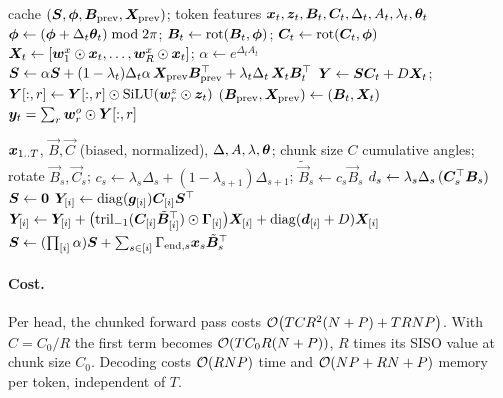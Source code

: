 \begin{algorithm}[t]
\caption{Mamba-3: one decoding step of one head (MIMO rank $R$; SISO is $R=1$).}
\label{alg:c07-m3-decode}
\begin{algorithmic}[1]
\Require cache $(\bm{S}, \bm{\phi}, \bm{B}_{\mathrm{prev}}, \bm{X}_{\mathrm{prev}})$; token features $\bm{x}_t, \bm{z}_t, \bm{B}_t, \bm{C}_t, \Delta_t, A_t, \lambda_t, \bm{\theta}_t$
\State $\bm{\phi} \gets (\bm{\phi} + \Delta_t\bm{\theta}_t) \bmod 2\pi$; \quad $\bm{B}_t \gets \operatorname{rot}(\bm{B}_t,\bm{\phi})$; \quad $\bm{C}_t \gets \operatorname{rot}(\bm{C}_t,\bm{\phi})$
\State $\bm{X}_t \gets [\bm{w}^x_1\odot\bm{x}_t,\dots,\bm{w}^x_R\odot\bm{x}_t]$; \quad $\alpha \gets e^{\Delta_tA_t}$
\State $\bm{S} \gets \alpha\bm{S} + (1-\lambda_t)\Delta_t\alpha\,\bm{X}_{\mathrm{prev}}\bm{B}_{\mathrm{prev}}^{\top} + \lambda_t\Delta_t\,\bm{X}_t\bm{B}_t^{\top}$ 
\State $\bm{Y} \gets \bm{S}\bm{C}_t + D\bm{X}_t$; \quad $\bm{Y}[:,r] \gets \bm{Y}[:,r]\odot\operatorname{SiLU}(\bm{w}^z_r\odot\bm{z}_t)$
\State $(\bm{B}_{\mathrm{prev}}, \bm{X}_{\mathrm{prev}}) \gets (\bm{B}_t, \bm{X}_t)$
\State \Return $\bm{y}_t = \sum_r \bm{w}^o_r\odot\bm{Y}[:,r]$
\end{algorithmic}
\end{algorithm}

\begin{algorithm}[t]
\caption{Mamba-3 SISO: chunked prefill of one head (structure of the Triton kernel).}
\label{alg:c07-m3-chunk}
\begin{algorithmic}[1]
\Require $\bm{x}_{1..T}$, $\vec B, \vec C$ (biased, normalized), $\Delta, A, \lambda, \bm{\theta}$; chunk size $C$
  \State cumulative angles; rotate $\vec B_s,\vec C_s$; $c_s \gets \lambda_s\Delta_s + (1-\lambda_{s+1})\Delta_{s+1}$; $\tilde{\vec B}_s \gets c_s\vec B_s$
  \State $d_s \gets \lambda_s\Delta_s\,(\bm{C}_s^{\top}\bm{B}_s)$ 
\EndFor
\State $\bm{S} \gets \bm0$
  \State $\bm{Y}_{[i]} \gets \operatorname{diag}(\bm{g}_{[i]})\bm{C}_{[i]}\bm{S}^{\top}$ 
  \State $\bm{Y}_{[i]} \gets \bm{Y}_{[i]} + \bigl(\operatorname{tril}_{-1}(\bm{C}_{[i]}\tilde{\bm{B}}_{[i]}^{\top})\odot\bm\Gamma_{[i]}\bigr)\bm{X}_{[i]} + \operatorname{diag}(\bm{d}_{[i]} + D)\bm{X}_{[i]}$
  \State $\bm{S} \gets (\prod_{[i]}\alpha)\bm{S} + \sum_{s\in[i]}\Gamma_{\mathrm{end},s}\bm{x}_s\tilde{\bm{B}}_s^{\top}$
\EndFor
\end{algorithmic}
\end{algorithm}

\paragraph{Cost.} Per head, the chunked forward pass costs
$\mathcal{O}\bigl(TCR^2(N+P) + TRNP\bigr)$. With $C = C_0/R$ the first term becomes
$\mathcal{O}(TC_0R(N+P))$, $R$ times its SISO value at chunk size $C_0$. Decoding costs $\mathcal{O}(RNP)$ time and $\mathcal{O}(NP + RN + P)$ memory per token,
independent of $T$.

